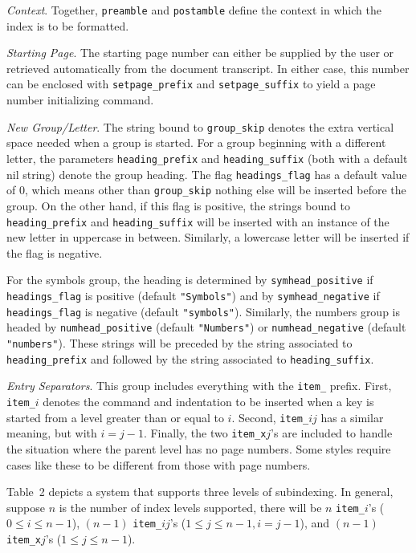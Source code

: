 {\it Context\/}.  Together, \verb|preamble| and \verb|postamble|
	define the context in which the index is to be formatted.

{\it Starting Page\/}.  The starting page number can either be supplied
	by the user or retrieved automatically from the document transcript.
	In either case, this number can be enclosed with \verb|setpage_prefix|
	and \verb|setpage_suffix| to yield a page number initializing command.

{\it New Group/Letter\/}.  The string bound to \verb|group_skip|
denotes the extra vertical space needed when a group is started.
For a group beginning with a different letter,
the parameters \verb|heading_prefix| and \verb|heading_suffix| (both with
a default nil string) denote the group heading.
The flag \verb|headings_flag| has a default value of 0, which
means other than \verb|group_skip| nothing else will be inserted before
the group.
On the other hand, if this flag is positive, the strings bound
to \verb|heading_prefix| and \verb|heading_suffix| will be inserted with
an instance of the new letter in uppercase in between.  Similarly,
a lowercase letter will be inserted if the flag is negative.

For the symbols group, the heading is determined by
\verb|symhead_positive| if \verb|headings_flag| is positive (default
\verb|"Symbols"|) and by \verb|symhead_negative| if \verb|headings_flag|
is negative (default \verb|"symbols"|). Similarly, the numbers group is
headed by \verb|numhead_positive| (default \verb|"Numbers"|) or
\verb|numhead_negative| (default \verb|"numbers"|). These strings will
be preceded by the string associated to \verb|heading_prefix| and
followed by the string associated to \verb|heading_suffix|.

{\it Entry Separators\/}.  This group includes everything with the
\verb|item_| prefix.  First, \verb|item_|$i$
denotes the command and indentation to be inserted when
a key is started from a level greater than or equal to $i$.
Second, \verb|item_|$ij$ has a similar meaning, but with
$i = j-1$.  Finally, the two \verb|item_x|$j$'s
are included to handle the situation where the parent level has no
page numbers.  Some styles require cases like these to be
different from those with page numbers.

Table~2 depicts a system that supports three levels of
subindexing.  In general, suppose $n$ is the number of index
levels supported, there will be $n$ \verb|item_|$i$'s
($0 \leq i \leq n-1$), $(n-1)$ \verb|item_|$ij$'s
($1 \leq j \leq n-1,  i = j-1$), and
$(n-1)$ \verb|item_x|$j$'s ($1 \leq j \leq n-1$).

